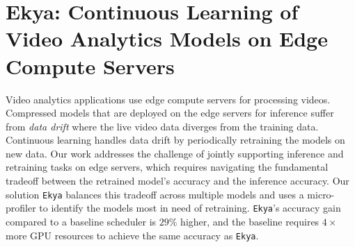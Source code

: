 \newcommand{\eg}{{\it e.g.,}\xspace}
\newcommand{\ie}{{\it i.e.,}\xspace}
\newcommand{\tbd}[1]{{\bf [[TBD: {#1}]]}}
\newcommand{\eat}[1]{}
\newcommand{\xref}[1]{\S\ref{#1}}
\newcommand{\name}{{\tt Ekya}\xspace}
\newcommand{\fair}{uniform\xspace}
\newcommand{\Fair}{Uniform\xspace}
\newcommand{\myparashort}[1]{\vspace{0.07cm}\noindent{\bf {#1}}~}
\newcommand{\mypara}[1]{\vspace{0.07cm}\noindent{\bf {#1}:}~}
\newcommand{\myparaq}[1]{\vspace{0.07cm}\noindent{\bf {#1}?}~}

\chapter{Ekya: Continuous Learning of Video Analytics Models on Edge Compute Servers}
\label{ch_ekya}

Video analytics applications use edge compute servers for processing videos.  
Compressed models that are deployed on the edge servers for inference suffer from {\em data drift} where the live video data diverges from the training data. Continuous learning handles data drift by periodically retraining the models on new data. Our work addresses the challenge of jointly supporting inference and retraining tasks on edge servers, which requires navigating the fundamental tradeoff between the retrained model's accuracy and the inference accuracy. 
Our solution \name balances this tradeoff across multiple models and uses a micro-profiler to identify the models most in need of retraining. {\name}'s accuracy gain compared to a baseline scheduler is $29\%$ higher, and the baseline requires $4\times$ more GPU resources to achieve the same accuracy as \name.











%
%
%



%
% 
